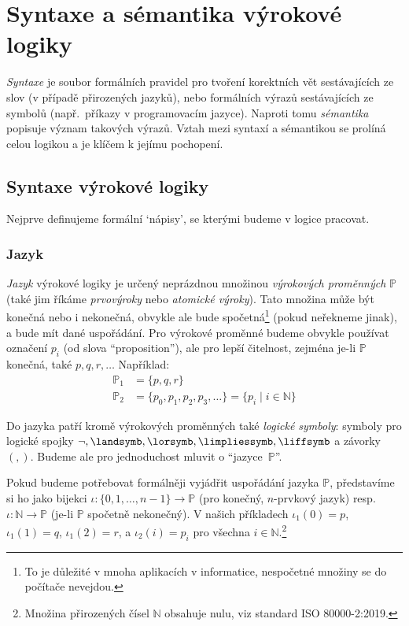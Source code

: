 \chapter{Syntaxe a sémantika výrokové logiky}

\emph{Syntaxe} je soubor formálních pravidel pro tvoření korektních vět sestávajících ze slov (v případě přirozených jazyků), nebo formálních výrazů sestávajících ze symbolů (např.\ příkazy v programovacím jazyce). Naproti tomu \emph{sémantika} popisuje význam takových výrazů. Vztah mezi syntaxí a sémantikou se prolíná celou logikou a je klíčem k jejímu pochopení.


\section{Syntaxe výrokové logiky}

Nejprve definujeme formální `nápisy', se kterými budeme v logice pracovat.


\subsection{Jazyk}

\emph{Jazyk} výrokové logiky je určený neprázdnou množinou \emph{výrokových proměnných} \( \mathbb P \) (také jim říkáme \emph{prvovýroky} nebo \emph{atomické výroky}). Tato množina může být konečná nebo i nekonečná, obvykle ale bude spočetná\footnote{To je důležité v mnoha aplikacích v informatice, nespočetné množiny se do počítače nevejdou.} (pokud neřekneme jinak), a bude mít dané uspořádání. Pro výrokové proměnné budeme obvykle používat označení \( p_i\) (od slova ``proposition''), ale pro lepší čitelnost, zejména je-li \( \mathbb P \) konečná, také \(p,q,r,\dots \) Například:
\begin{align*}
    \mathbb P_1 &= \{ p, q, r\}\\
    \mathbb P_2 &= \{ p_0, p_1, p_2, p_3, \ldots \} = \{ p_i \mid i \in \mathbb N \}
\end{align*}

Do jazyka patří kromě výrokových proměnných také \emph{logické symboly}: symboly pro logické spojky \( \neg,\landsymb,\lorsymb, \limpliessymb, \liffsymb \) a závorky \( (,) \). Budeme ale pro jednoduchost mluvit o ``jazyce~\( \mathbb P \)''.

\begin{remark}\label{remark:order-of-language}
Pokud budeme potřebovat formálněji vyjádřit uspořádání jazyka $\mathbb P$, představíme si ho jako bijekci $\iota\colon\{0,1,\dots,n-1\}\to \mathbb P$ (pro konečný, $n$-prvkový jazyk) resp.\ $\iota\colon\mathbb N\to \mathbb P$ (je-li $\mathbb P$ spočetně nekonečný). V našich příkladech $\iota_1(0)=p$, $\iota_1(1)=q$, $\iota_1(2)=r$, a $\iota_2(i)=p_i$ pro všechna $i\in\mathbb N$.\footnote{Množina přirozených čísel $\mathbb N$ obsahuje nulu, viz standard ISO 80000-2:2019.}
\end{remark}


